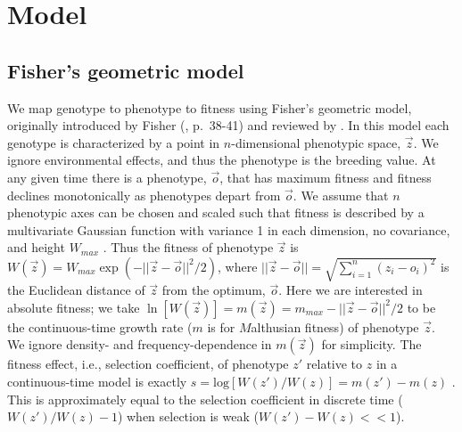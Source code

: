 \documentclass[9pt,twocolumn,twoside,lineno]{gsajnl}
\begin{document}
\section{Model}
\label{sec:model}

\subsection{Fisher's geometric model}
\label{sec:FGM}

We map genotype to phenotype to fitness using Fisher's geometric model, originally introduced by Fisher (\citeyear{Fisher1930}, p.\ 38-41) and reviewed by \cite{Tenaillon2014}.
In this model each genotype is characterized by a point in $n$-dimensional phenotypic space, $\vec{z}$.
We ignore environmental effects, and thus the phenotype is the breeding value.
At any given time there is a phenotype, $\vec{o}$, that has maximum fitness and fitness declines monotonically as phenotypes depart from $\vec{o}$. 
We assume that $n$ phenotypic axes can be chosen and scaled such that fitness is described by a multivariate Gaussian function with variance 1 in each dimension, no covariance, and height $W_{max}$ \citep[which can always be done when considering genotypes close enough to an non-degenerate optimum;][]{martin2014fisher}.
Thus the fitness of phenotype $\vec{z}$ is $W(\vec{z}) = W_{max}\exp(-||\vec{z}-\vec{o}||^2/2)$, where $||\vec{z}-\vec{o}||=\sqrt{\sum_{i=1}^n(z_i-o_i)^2 }$ is the Euclidean distance of $\vec{z}$ from the optimum, $\vec{o}$.
Here we are interested in absolute fitness; we take $\ln[W(\vec{z})]=m(\vec{z})=m_{max}-||\vec{z}-\vec{o}||^2/2$ to be the continuous-time growth rate ($m$ is for $M$althusian fitness) of phenotype $\vec{z}$.
We ignore density- and frequency-dependence in $m(\vec{z})$ for simplicity.
The fitness effect, i.e., selection coefficient, of phenotype $z'$ relative to $z$ in a continuous-time model is exactly $s = \mathrm{log}[W(z')/W(z)] = m(z') - m(z)$ \citep{Martin2015}.
This is approximately equal to the selection coefficient in discrete time ($W(z')/W(z) - 1$) when selection is weak ($W(z')-W(z)<<1$).
\end{document}
